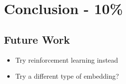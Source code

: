 \chapter{Conclusion - 10\%}


\section{Future Work}

\begin{itemize}
    \item Try reinforcement learning instead
    \item Try a different type of embedding?
\end{itemize}